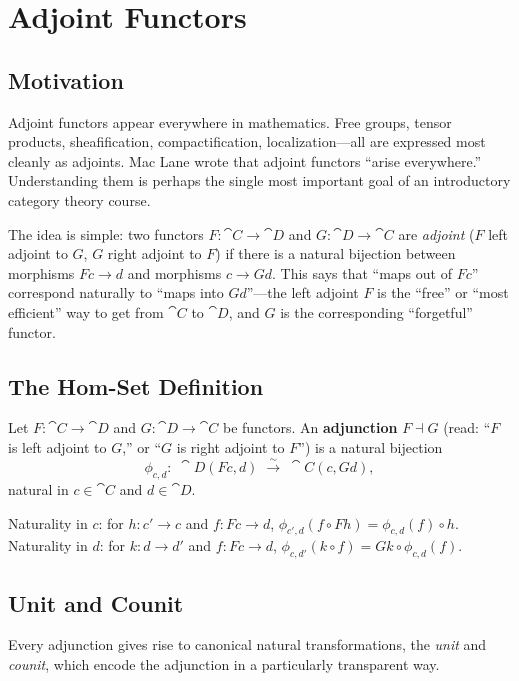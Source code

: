 \chapter{Adjoint Functors}
\label{ch:adjoints}

\section{Motivation}

Adjoint functors appear everywhere in mathematics. Free groups, tensor products, sheafification, compactification, localization—all are expressed most cleanly as adjoints. Mac Lane wrote that adjoint functors ``arise everywhere.'' Understanding them is perhaps the single most important goal of an introductory category theory course.

The idea is simple: two functors $F: \cat{C} \to \cat{D}$ and $G: \cat{D} \to \cat{C}$ are \emph{adjoint} ($F$ left adjoint to $G$, $G$ right adjoint to $F$) if there is a natural bijection between morphisms $Fc \to d$ and morphisms $c \to Gd$. This says that ``maps out of $Fc$'' correspond naturally to ``maps into $Gd$''—the left adjoint $F$ is the ``free'' or ``most efficient'' way to get from $\cat{C}$ to $\cat{D}$, and $G$ is the corresponding ``forgetful'' functor.

\section{The Hom-Set Definition}

\begin{definition}
Let $F: \cat{C} \to \cat{D}$ and $G: \cat{D} \to \cat{C}$ be functors. An \textbf{adjunction} $F \dashv G$ (read: ``$F$ is left adjoint to $G$,'' or ``$G$ is right adjoint to $F$'') is a natural bijection
\[
  \phi_{c,d}:\; \cat{D}(Fc, d) \;\xrightarrow{\;\sim\;}\; \cat{C}(c, Gd),
\]
natural in $c \in \cat{C}$ and $d \in \cat{D}$.

Naturality in $c$: for $h: c' \to c$ and $f: Fc \to d$, $\phi_{c',d}(f \circ Fh) = \phi_{c,d}(f) \circ h$.
Naturality in $d$: for $k: d \to d'$ and $f: Fc \to d$, $\phi_{c,d'}(k \circ f) = Gk \circ \phi_{c,d}(f)$.
\end{definition}

\section{Unit and Counit}

Every adjunction gives rise to canonical natural transformations, the \emph{unit} and \emph{counit}, which encode the adjunction in a particularly transparent way.

